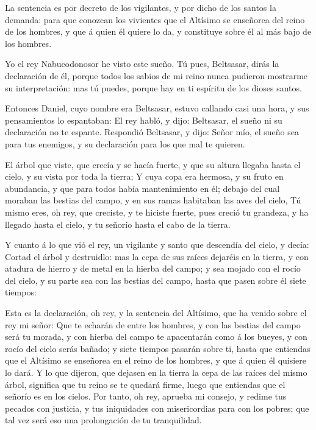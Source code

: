  La sentencia es por decreto de los vigilantes, y por dicho
de los santos la demanda: para que conozcan los vivientes que el
Altísimo se enseñorea del reino de los hombres, y que á quien él quiere
lo da, y constituye sobre él al más bajo de los hombres.

 Yo el rey Nabucodonosor he visto este sueño. Tú pues,
Beltsasar, dirás la declaración de él, porque todos los sabios de mi
reino nunca pudieron mostrarme su interpretación: mas tú puedes, porque
hay en ti espíritu de los dioses santos.

 Entonces Daniel, cuyo nombre era Beltsasar, estuvo
callando casi una hora, y sus pensamientos lo espantaban: El rey habló,
y dijo: Beltsasar, el sueño ni su declaración no te espante. Respondió
Beltsasar, y dijo: Señor mío, el sueño sea para tus enemigos, y su
declaración para los que mal te quieren.

 El árbol que viste, que crecía y se hacía fuerte, y que su
altura llegaba hasta el cielo, y su vista por toda la tierra;
 Y cuya copa era hermosa, y su fruto en abundancia, y que
para todos había mantenimiento en él; debajo del cual moraban las
bestias del campo, y en sus ramas habitaban las aves del cielo,
 Tú mismo eres, oh rey, que creciste, y te hiciste fuerte,
pues creció tu grandeza, y ha llegado hasta el cielo, y tu señorío hasta
el cabo de la tierra.

 Y cuanto á lo que vió el rey, un vigilante y santo que
descendía del cielo, y decía: Cortad el árbol y destruidlo: mas la cepa
de sus raíces dejaréis en la tierra, y con atadura de hierro y de metal
en la hierba del campo; y sea mojado con el rocío del cielo, y su parte
sea con las bestias del campo, hasta que pasen sobre él siete tiempos:

 Esta es la declaración, oh rey, y la sentencia del
Altísimo, que ha venido sobre el rey mi señor:  Que te
echarán de entre los hombres, y con las bestias del campo será tu
morada, y con hierba del campo te apacentarán como á los bueyes, y con
rocío del cielo serás bañado; y siete tiempos pasarán sobre ti, hasta
que entiendas que el Altísimo se enseñorea en el reino de los hombres, y
que á quien él quisiere lo dará.  Y lo que dijeron, que
dejasen en la tierra la cepa de las raíces del mismo árbol, significa
que tu reino se te quedará firme, luego que entiendas que el señorío es
en los cielos.  Por tanto, oh rey, aprueba mi consejo, y
redime tus pecados con justicia, y tus iniquidades con misericordias
para con los pobres; que tal vez será eso una prolongación de tu
tranquilidad.

